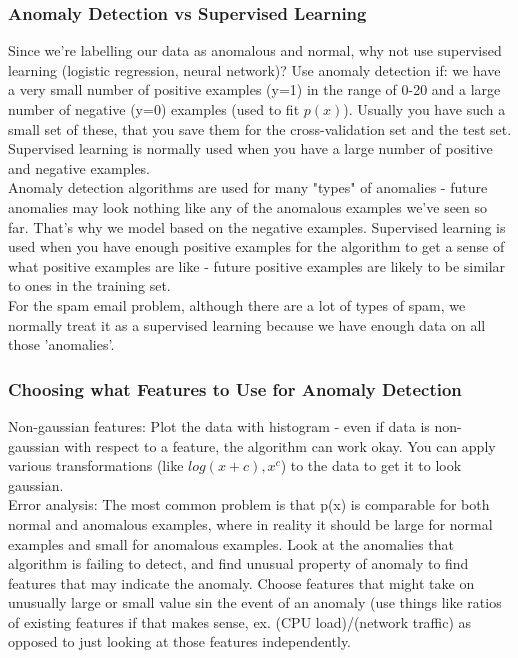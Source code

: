 \documentclass[11pt,letterpaper]{article}
\begin{document}
\subsubsection{Anomaly Detection vs Supervised Learning}
Since we're labelling our data as anomalous and normal, why not use supervised learning (logistic regression, neural network)?
Use anomaly detection if: we have a very small number of positive examples (y=1) in the range of 0-20 and a large number of negative (y=0) examples (used to fit $p(x)$). Usually you have such a small set of these, that you save them for the cross-validation set and the test set. Supervised learning is normally used when you have a large number of positive and negative examples.\\
Anomaly detection algorithms are used for many "types" of anomalies - future anomalies may look nothing like any of the anomalous examples we've seen so far. That's why we model based on the negative examples.  Supervised learning is used when you have enough positive examples for the algorithm to get a sense of what positive examples are like - future positive examples are likely to be similar to ones in the training set.\\
For the spam email problem, although there are a lot of types of spam, we normally treat it as a supervised learning because we have enough data on all those 'anomalies'. 

\subsubsection{Choosing what Features to Use for Anomaly Detection}
Non-gaussian features: Plot the data with histogram - even if data is non-gaussian with respect to a feature, the algorithm can work okay. You can apply various transformations (like $log(x + c), x^c$) to the data to get it to look gaussian.\\
Error analysis: The most common problem is that p(x) is comparable for both normal and anomalous examples, where in reality it should be large for normal examples and small for anomalous examples. Look at the anomalies that algorithm is failing to detect, and find unusual property of anomaly to find features that may indicate the anomaly. Choose features that might take on unusually large or small value sin the event of an anomaly (use things like ratios of existing features if that makes sense, ex. (CPU load)/(network traffic) as opposed to just looking at those features independently. 
\end{document}
